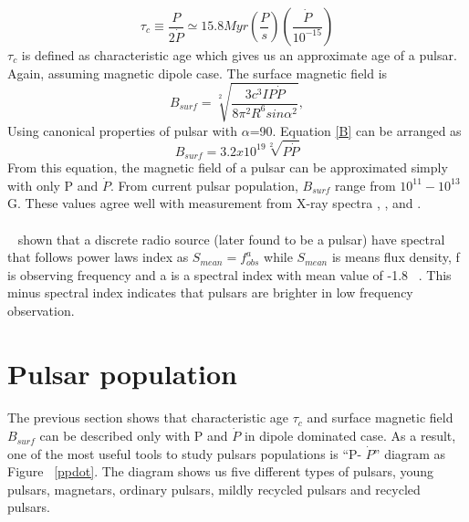 \documentclass[thesis_msc.tex]{subfiles}
\begin{document}
   \begin{equation} \label{tc}
   \tau_c \equiv \frac{P}{2\dot{P}} \simeq 15.8 Myr (\frac{P}{s})(\frac{\dot{P}}{10^{-15}})
   \end{equation}
 $\tau_c$ is defined as characteristic age which gives us an approximate age of a pulsar. Again, assuming magnetic dipole case. The surface magnetic field is  
    \begin{equation}\label{B}
    B_{surf}=\sqrt[2]{\frac{3c^3IP\dot{P}}{8\pi^2R^6sin \alpha^2}},
    \end{equation}
    Using canonical properties of pulsar with $\alpha$=90. Equation \ref{B} can be arranged as
    \begin{equation}
    B_{surf}=3.2x10^{19}\sqrt[2]{P\dot{P}}
    \end{equation}
 From this equation, the magnetic field of a pulsar can be approximated simply with only P and $\dot{P}$. From current pulsar population, $B_{surf}$ range from $10^{11}-10^{13}$ G. These values agree well with measurement from X-ray spectra \citep{coburn2002magnetic}, \citep{bignami2003magnetic}, and \citep{kouveliotou1998x}.  
    
\paragraph{} ~\cite{conway1962radio} shown that a discrete radio source (later found to be a pulsar) have spectral that follows power laws index as $S_{mean} = f^a_{obs}$ while $S_{mean}$ is means flux density, f is observing frequency and a is a spectral index with mean value of -1.8 ~\citep{maron2000pulsar}. This minus spectral index indicates that pulsars are brighter in low frequency observation.      
   
\section{Pulsar population} \label{pulsartype}
    \paragraph{} The previous section shows that characteristic age $\tau_c$ and surface magnetic field $B_{surf}$  can be described only with P and $\dot{P}$ in dipole dominated case. As a result, one of the most useful tools to study pulsars populations is  ``P- $\dot{P}$'' diagram as Figure ~\ref{ppdot}.  The diagram shows us five different types of pulsars, young pulsars, magnetars, ordinary pulsars, mildly recycled pulsars and recycled pulsars. 
    
\end{document}

